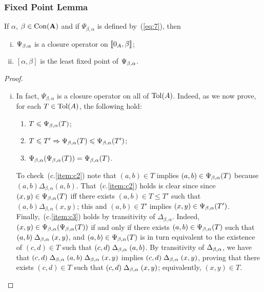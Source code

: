 \subsubsection{Fixed Point Lemma}
\begin{lemma}
  \label{lem:fixed-point-comm}
  If $\alpha$, $\beta\in \operatorname{Con}(\mathbf{A})$ and 
  if $\Psi_{\beta, \alpha}$ is defined by~(\ref{eq:7}), then 
  \begin{enumerate}[(i)]
  \item \label{item:1} $\Psi_{\beta, \alpha}$ is a closure operator on $\llbracket 0_A, \beta\rrbracket$;
  \item \label{item:2} $[\alpha, \beta]$ is the least fixed point of $\Psi_{\beta, \alpha}$.
  \end{enumerate}
\end{lemma}
\begin{proof}\
  \begin{enumerate}[(i)]
  \item 
  In fact, $\Psi_{\beta, \alpha}$ is a closure operator on all
  of $\operatorname{Tol}(A)$.
  Indeed, as we now prove, for each $T \in \operatorname{Tol}(A)$, the following hold:
  \begin{enumerate}[(c.1)]
  \item \label{item:c1} $T  \leqslant \Psi_{\beta, \alpha}(T )$;     
  \item \label{item:c2} $T  \leqslant T'  \Rightarrow \Psi_{\beta, \alpha}(T) \leqslant \Psi_{\beta, \alpha}(T')$;    
  \item \label{item:c3} $\Psi_{\beta, \alpha}(\Psi_{\beta, \alpha}(T))  = \Psi_{\beta, \alpha}(T)$. 
  \end{enumerate}
  To check~(c.\ref{item:c2}) note that $(a,b) \in T $
  implies $(a,b) \in \Psi_{\beta, \alpha}(T )$ because $(a,b)\mathrel{\Delta_{\beta, \alpha}} (a,b)$.
  That~(c.\ref{item:c2}) holds is clear since since $(x,y) \in \Psi_{\beta, \alpha}(T )$ iff there exists
  $(a,b) \in T  \leq T'$ such that
  $(a,b) \mathrel{\Delta_{\beta, \alpha}} (x,y)$; this and $(a,b) \in T'$ implies
  $(x,y) \in \Psi_{\beta, \alpha}(T')$.
  Finally,~(c.\ref{item:c3}) holds by transitivity of
  $\Delta_{\beta, \alpha}$. Indeed, $(x,y) \in \Psi_{\beta, \alpha}(\Psi_{\beta, \alpha}(T))$ if and only if
  there exists $(a,b) \in \Psi_{\beta, \alpha}(T)$ such that
  $(a,b) \mathrel{\Delta_{\beta, \alpha}} (x,y)$, and $(a,b) \in \Psi_{\beta, \alpha}(T)$ is in turn equivalent to 
  the existence of $(c,d) \in T $ such that
  $(c,d) \mathrel{\Delta_{\beta, \alpha}} (a,b)$. By transitivity of $\Delta_{\beta, \alpha}$, we have that
  $(c,d) \mathrel{\Delta_{\beta, \alpha}} (a,b) \mathrel{\Delta_{\beta, \alpha}} (x,y)$ implies
  $(c,d) \mathrel{\Delta_{\beta, \alpha}} (x,y)$, proving that there exists $(c,d) \in T $ such that
  $(c,d) \mathrel{\Delta_{\beta, \alpha}} (x,y)$; equivalently, $(x,y) \in T $.

  \medskip


\end{enumerate}
\end{proof}
